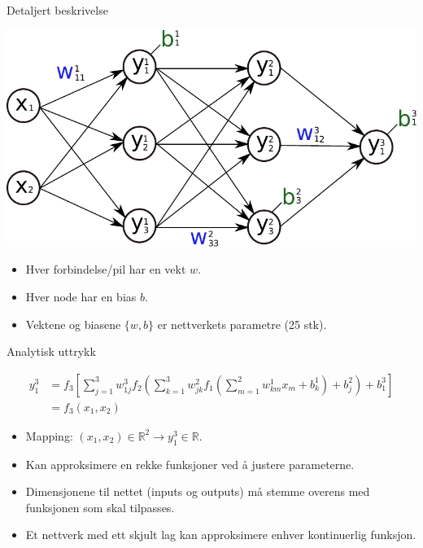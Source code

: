 \documentclass{beamer}
\begin{document}
\begin{frame}{Detaljert beskrivelse}
 
\centering
\includegraphics[width=0.8\linewidth]{../Figures/Theory/networkWithNotationAltered.pdf}

\begin{itemize}
 \item Hver forbindelse/pil har en vekt $w$. 
 \item Hver node har en bias $b$.
 \item Vektene og biasene $\{w,b\}$ er nettverkets parametre (25 stk). 
\end{itemize}

\end{frame}


\begin{frame}{Analytisk uttrykk}

\begin{align*}
  y_1^3 &= f_3\left[\sum_{j=1}^3 w_{1j}^3 f_2\left(\sum_{k=1}^3 w_{jk}^2 f_1\left(\sum_{m=1}^2 w_{km}^1 x_m + b_k^1\right) + b_j^2\right)
  + b_1^3\right] \\
  &= f_3(x_1, x_2)
\end{align*}
\begin{itemize}
 \item Mapping: $(x_1, x_2) \in \mathbb{R}^2  \rightarrow y_1^3 \in \mathbb{R}$. 
 \item Kan approksimere en rekke funksjoner ved å justere parameterne. 
 \item Dimensjonene til nettet (inputs og outputs) må stemme overens med funksjonen som skal tilpasses.
 \item Et nettverk med ett skjult lag kan approksimere enhver kontinuerlig funksjon. 
\end{itemize}


\end{frame}
\end{document}
